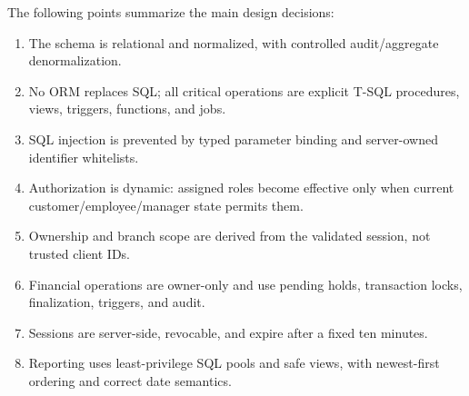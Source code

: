 \documentclass[11pt,a4paper,oneside]{report}
\begin{document}
The following points summarize the main design decisions:
\begin{enumerate}
\item The schema is relational and normalized, with controlled audit/aggregate denormalization.
\item No ORM replaces SQL; all critical operations are explicit T-SQL procedures, views, triggers, functions, and jobs.
\item SQL injection is prevented by typed parameter binding and server-owned identifier whitelists.
\item Authorization is dynamic: assigned roles become effective only when current customer/employee/manager state permits them.
\item Ownership and branch scope are derived from the validated session, not trusted client IDs.
\item Financial operations are owner-only and use pending holds, transaction locks, finalization, triggers, and audit.
\item Sessions are server-side, revocable, and expire after a fixed ten minutes.
\item Reporting uses least-privilege SQL pools and safe views, with newest-first ordering and correct date semantics.
\end{enumerate}
\end{document}
